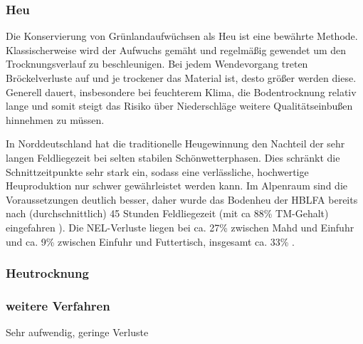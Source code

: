 \subsubsection{Heu}
\label{subsub:Heu}
Die Konservierung von Grünlandaufwüchsen als Heu ist eine bewährte Methode.
Klassischerweise wird der Aufwuchs gemäht und regelmäßig gewendet um den Trocknungsverlauf zu beschleunigen.
Bei jedem Wendevorgang treten Bröckelverluste auf und je trockener das Material ist, desto größer werden diese.
Generell dauert, insbesondere bei feuchterem Klima, die Bodentrocknung relativ lange und somit steigt das Risiko über Niederschläge weitere Qualitätseinbußen hinnehmen zu müssen.

In Norddeutschland hat die traditionelle Heugewinnung den Nachteil der sehr langen Feldliegezeit bei selten stabilen Schönwetterphasen.
Dies schränkt die Schnittzeitpunkte sehr stark ein, sodass eine verlässliche, hochwertige Heuproduktion nur schwer gewährleistet werden kann.
Im Alpenraum sind die Voraussetzungen deutlich besser, daher wurde das Bodenheu der \ac{HBLFA} bereits nach (durchschnittlich) 45 Stunden Feldliegezeit (mit ca 88\% \ac{TM}-Gehalt) eingefahren \parencite[63]{gruber2015einfluss}).
Die \ac{NEL}-Verluste liegen bei ca. 27\% zwischen Mahd und Einfuhr und ca. 9\% zwischen Einfuhr und Futtertisch, insgesamt ca. 33\% \parencite[30]{fritz2018wirtscahftliche}.

\subsubsection{Heutrocknung}
\label{subsub:Heutrocknung}

\subsubsection{weitere Verfahren}
\label{subsub:Peletts}
Sehr aufwendig, geringe Verluste \parencite[12f]{engel2013protein}


